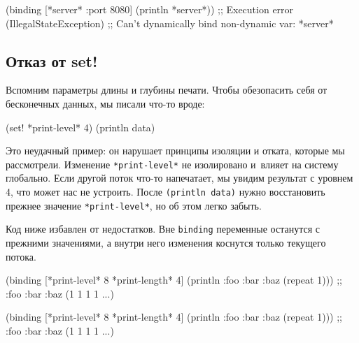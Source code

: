 \else

\begin{english}
  \begin{clojure}
(binding [*server* {:port 8080}]
  (println *server*))
;; Execution error (IllegalStateException)
;; Can't dynamically bind non-dynamic var: *server*
  \end{clojure}
\end{english}

\fi

\subsection{Отказ от set!}

Вспомним параметры длины и глубины печати. Чтобы обезопасить себя от бесконечных
данных, мы писали что-то вроде:

\begin{english}
  \begin{clojure}
(set! *print-level* 4)
(println data)
  \end{clojure}
\end{english}


Это неудачный пример: он нарушает принципы изоляции и отката, которые мы
рассмотрели. Изменение \verb|*print-level*| не изолировано и~влияет на систему
глобально. Если другой поток что-то напечатает, мы увидим результат с уровнем 4,
что может нас не устроить. После \verb|(println data)| нужно восстановить
прежнее значение \verb|*print-level*|, но об этом легко забыть.

Код ниже избавлен от недостатков. Вне \verb|binding| переменные останутся с
прежними значениями, а внутри него изменения коснутся только текущего потока.

\ifnarrow

\begin{english}
  \begin{clojure}
(binding [*print-level* 8
          *print-length* 4]
  (println
    {:foo {:bar {:baz (repeat 1)}}}))
;; {:foo {:bar {:baz (1 1 1 1 ...)}}}
  \end{clojure}
\end{english}

\else

\begin{english}
  \begin{clojure}
(binding [*print-level* 8
          *print-length* 4]
  (println {:foo {:bar {:baz (repeat 1)}}}))
;; {:foo {:bar {:baz (1 1 1 1 ...)}}}
  \end{clojure}
\end{english}

